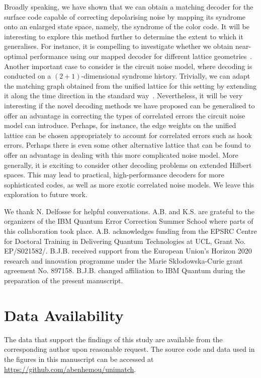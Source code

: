 \documentclass[a4paper,twocolumn,11pt,accepted=2024-12-23]{quantumarticle}
\begin{document}
Broadly speaking, we have shown that we can obtain a matching decoder for the surface code capable of correcting depolarising noise by mapping its syndrome onto an enlarged state space, namely, the syndrome of the color code. It will be interesting to explore this method further to determine the extent to which it generalises. For instance, it is compelling to investigate whether we obtain near-optimal performance using our mapped decoder for different lattice geometries~\cite{beverland2019role}. 
Another important case to consider is the circuit noise model, where decoding is conducted on a $(2+1)$-dimensional syndrome history. Trivially, we can adapt the matching graph obtained from the unified lattice for this setting by extending it along the time direction in the standard way~\cite{dennis2002topological, brown2020parallelized, brown2022conservation}. Nevertheless, it will be very interesting if the novel decoding methods we have proposed can be generalised to offer an advantage in correcting the types of correlated errors the circuit noise model can introduce. Perhaps, for instance, the edge weights on the unified lattice can be chosen appropriately to account for correlated errors such as hook errors. Perhaps there is even some other alternative lattice that can be found to offer an advantage in dealing with this more complicated noise model.
More generally, it is exciting to consider other decoding problems on extended Hilbert spaces. This may lead to practical, high-performance decoders for more sophisticated codes, as well as more exotic correlated noise models. We leave this exploration to future work.


\begin{acknowledgments} We thank N. Delfosse for helpful conversations. A.B. and K.S. are grateful to the organizers of the IBM Quantum Error Correction Summer School where parts of this collaboration took place. 
A.B. acknowledges funding from the EPSRC Centre for Doctoral Training in Delivering Quantum Technologies at UCL, Grant No. EP/S021582/. B.J.B. received support from the European Union’s Horizon 2020 research and innovation programme under the Marie Skłodowska-Curie grant agreement No. 897158. B.J.B. changed affiliation to IBM Quantum during the preparation of the present manuscript.
\end{acknowledgments}


\section*{Data Availability}
The data that support the findings of this study are available from the corresponding author upon reasonable request. The source code and data used in the figures in this manuscript can be accessed at \url{https://github.com/abenhemou/unimatch}.
\end{document}

